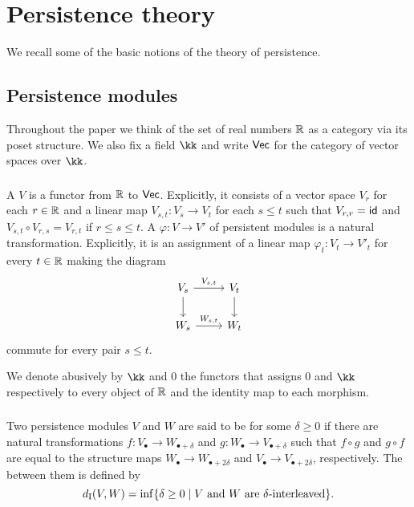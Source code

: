
\section{Persistence theory}

We recall some of the basic notions of the theory of persistence.

\subsection{Persistence modules}

Throughout the paper we think of the set of real numbers $\R$ as a category via its poset structure.
We also fix a field $\kk$ and write $\Vec$ for the category of vector spaces over $\kk$.

\subsubsection{} A  $V$ is a functor from $\R$ to $\Vec$.
Explicitly, it consists of a vector space $V_r$ for each $r \in \R$ and a linear map $V_{s,t} \colon V_s \to V_t$ for each $s \leq t$ such that $V_{r,r} = \id$ and
$V_{s,t} \circ V_{r,s} = V_{r,t}$ if $r \leq s \leq t$.
A  $\varphi \colon V \to V'$ of persistent modules is a natural transformation.
Explicitly, it is an assignment of a linear map $\varphi_t \colon V_t \to V'_t$ for every $t \in \R$ making the diagram
\begin{equation*}
	\begin{tikzcd}
		V_{s} \arrow[r, "V_{s,t}"] \arrow[d] & V_{t} \arrow[d] \\
		W_{s} \arrow[r, "W_{s,t}"] & W_{t}
	\end{tikzcd}
\end{equation*}
commute for every pair $s \leq t$.

We denote abusively by $\kk$ and $0$ the functors that assigns $0$ and $\kk$ respectively to every object of $\R$ and the identity map to each morphism.

\subsubsection{} Two persistence modules $V$ and $W$ are said to be  for some $\delta \geq 0$ if there are natural transformations $f \colon V_{\bullet} \to W_{\bullet + \delta}$ and $g \colon W_{\bullet} \to V_{\bullet + \delta}$ such that $f \circ g$ and $g \circ f$ are equal to the structure maps $W_{\bullet} \to W_{\bullet + 2\delta}$ and $V_{\bullet} \to V_{\bullet + 2\delta}$, respectively.
The  between them is defined by
\[
\di(V, W) = \inf\set{\delta \geq 0 \mid V \text{ and } W \text{ are } \delta\text{-interleaved}}.
\]

